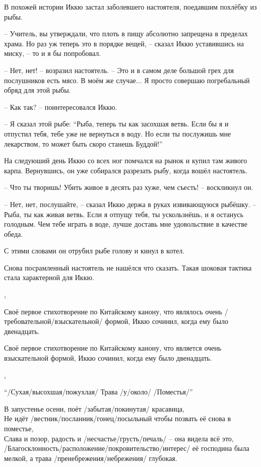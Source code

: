 \begin{ver}[1]
В похожей истории Иккю застал заболевшего настоятеля, поедавшим
похлёбку из рыбы.

-- Учитель, вы утверждали, что плоть в пищу абсолютно запрещена в
   пределах храма. Но раз уж теперь это в порядке вещей, -- сказал
   Иккю уставившись на миску, -- то и я бы попробовал.

-- Нет, нет! -- возразил настоятель. -- Это и в самом деле большой
   грех для послушников есть мясо. В моём же случае... Я просто
   совершаю погребальный обряд для этой рыбы.

-- Как так? -- поинтересовался Иккю.

-- Я сказал этой рыбе: ``Рыба, теперь ты как засохшая ветвь. Если бы я
   и отпустил тебя, тебе уже не вернуться в воду. Но если ты послужишь
   мне лекарством, то может быть скоро станешь Буддой!''

На следуюший день Иккю со всех ног помчался на рынок и купил там
живого карпа. Вернувшись, он уже собирался разрезать рыбу, когда вошёл
настоятель.

-- Что ты творишь! Убить живое в десять раз хуже, чем съесть! --
   воскликнул он.

-- Нет, нет, послушайте, -- сказал Иккю держа в руках извивающуюся
   рыбёшку. -- Рыба, ты как живая ветвь. Если я отпущу тебя, ты
   ускользнёшь, и я останусь голодным. Чем тебе играть в воде,
   лучше доставь мне удовольствие в качестве обеда.

С этими словами он отрубил рыбе голову и кинул в котел.

Снова посрамленный настоятель не нашёлся что сказать.  Такая шоковая
тактика стала характерной для Иккю.
\end{ver}
\sep

\begin{ver}
Своё первое стихотворение по Китайскому канону, что являлось очень
/требовательной/взыскательной/ формой, Иккю сочинил, когда ему было
двенадцать. 
\end{ver}
\begin{ver}[1]
Своё первое стихотворение по Китайскому канону, что является очень
взыскательной формой, Иккю сочинил, когда ему было
двенадцать. 
\end{ver}
\sep
\begin{ver}
\begin{verses}
  \centerline{``/Сухая/высохшая/пожухлая/ Трава /у/около/
    /Поместья/''}
В запустенье осени, поёт /забытая/покинутая/ красавица,\\
Не идёт /вестник/посланник/гонец/посыльный чтобы позвать её снова в
поместье,\\
Слава и позор, радость и /несчастье/грусть/печаль/ -- она видела всё это,\\
/Благосклонность/расположение/покровительство/интерес/ её господина
была мелкой, а трава /пренебрежения/небрежения/ глубокая.
\end{verses}
\end{ver}

